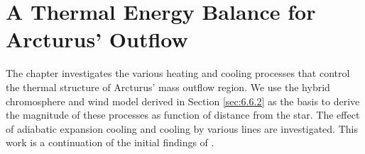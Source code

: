 \chapter{A Thermal Energy Balance for Arcturus' Outflow}
\label{chap:7}

The chapter investigates the various heating and cooling processes that control the thermal structure of Arcturus' mass outflow region. We use the hybrid chromosphere and wind model derived in Section \ref{sec:6.6.2} as the basis to derive the magnitude of these processes as function of distance from the star. The effect of adiabatic expansion cooling and cooling by various lines are investigated. This work is a continuation of the initial findings of \cite{ogorman_2011}.

\pagebreak

